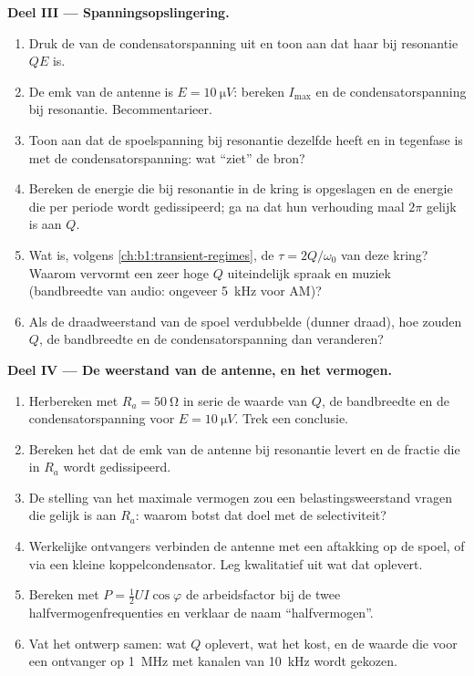 \begin{problem}
\medskip
\noindent\textbf{Deel III --- Spanningsopslingering.}
\begin{enumerate}[resume]
  \item Druk de  van de condensatorspanning uit en toon aan
        dat haar  bij resonantie $QE$ is.
  \item De emk van de antenne is $E = \qty{10}{\micro V}$: bereken $I_{\max}$
        en de condensatorspanning bij resonantie. Becommentarieer.
  \item Toon aan dat de spoelspanning bij resonantie dezelfde  heeft en in
        tegenfase is met de condensatorspanning: wat ``ziet'' de bron?
  \item Bereken de energie die bij resonantie in de kring is opgeslagen en de
        energie die per periode wordt gedissipeerd; ga na dat hun verhouding maal
        $2\pi$ gelijk is aan $Q$.
  \item Wat is, volgens \cref{ch:b1:transient-regimes}, de 
        $\tau = 2Q/\omega_0$ van deze kring? Waarom vervormt een zeer hoge $Q$
        uiteindelijk spraak en muziek (bandbreedte van audio:
        ongeveer \qty{5}{kHz} voor AM)?
  \item Als de draadweerstand van de spoel verdubbelde (dunner draad), hoe zouden
        $Q$, de bandbreedte en de condensatorspanning dan veranderen?
\end{enumerate}

\medskip
\noindent\textbf{Deel IV --- De weerstand van de antenne, en het vermogen.}
\begin{enumerate}[resume]
  \item Herbereken met $R_a = \qty{50}{\ohm}$ in serie de waarde van $Q$, de
        bandbreedte en de condensatorspanning voor $E = \qty{10}{\micro V}$.
        Trek een conclusie.
  \item Bereken het  dat de emk van de antenne bij
        resonantie levert en de fractie die in $R_a$ wordt gedissipeerd.
  \item De stelling van het maximale vermogen zou een belastingsweerstand vragen die gelijk is
        aan $R_a$: waarom botst dat doel met de selectiviteit?
  \item Werkelijke ontvangers verbinden de antenne met een aftakking op de spoel, of
        via een kleine koppelcondensator. Leg kwalitatief uit wat dat
        oplevert.
  \item Bereken met $P = \tfrac12 UI\cos\varphi$ de arbeidsfactor bij
        de twee halfvermogenfrequenties en verklaar de naam
        ``halfvermogen''.
  \item Vat het ontwerp samen: wat $Q$ oplevert, wat het kost, en de
        waarde die voor een ontvanger op \qty{1}{MHz} met kanalen van \qty{10}{kHz}
        wordt gekozen.
\end{enumerate}
\end{problem}
